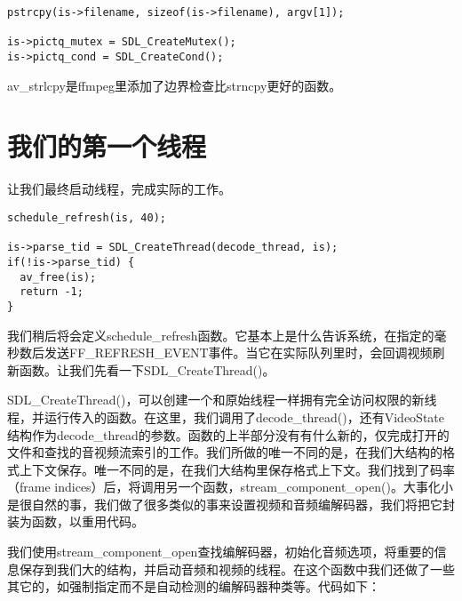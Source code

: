 \begin{lstlisting}
pstrcpy(is->filename, sizeof(is->filename), argv[1]);

is->pictq_mutex = SDL_CreateMutex();
is->pictq_cond = SDL_CreateCond();
\end{lstlisting}

av_strlcpy是ffmpeg里添加了边界检查比strncpy更好的函数。 

\section{我们的第一个线程 }

让我们最终启动线程，完成实际的工作。
\begin{lstlisting}
schedule_refresh(is, 40);

is->parse_tid = SDL_CreateThread(decode_thread, is);
if(!is->parse_tid) {
  av_free(is);
  return -1;
}
\end{lstlisting}

我们稍后将会定义schedule_refresh函数。它基本上是什么告诉系统，在指定的毫秒数后发送FF_REFRESH_EVENT事件。当它在实际队列里时，会回调视频刷新函数。让我们先看一下SDL_CreateThread()。

SDL_CreateThread()，可以创建一个和原始线程一样拥有完全访问权限的新线程，并运行传入的函数。在这里，我们调用了decode_thread()，还有VideoState结构作为decode_thread的参数。函数的上半部分没有有什么新的，仅完成打开的文件和查找的音视频流索引的工作。我们所做的唯一不同的是，在我们大结构的格式上下文保存。唯一不同的是，在我们大结构里保存格式上下文。我们找到了码率（frame indices）后，将调用另一个函数，stream_component_open()。大事化小是很自然的事，我们做了很多类似的事来设置视频和音频编解码器，我们将把它封装为函数，以重用代码。

我们使用stream_component_open查找编解码器，初始化音频选项，将重要的信息保存到我们大的结构，并启动音频和视频的线程。在这个函数中我们还做了一些其它的，如强制指定而不是自动检测的编解码器种类等。代码如下：


